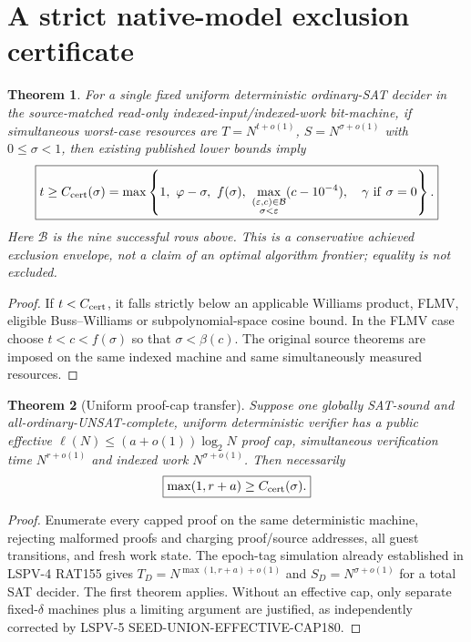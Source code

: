 \documentclass[11pt]{article}
\newtheorem{theorem}{Theorem}
\begin{document}
\section{A strict native-model exclusion certificate}
\begin{theorem}
For a \emph{single fixed uniform deterministic ordinary-SAT decider}
in the source-matched read-only indexed-input/indexed-work bit-machine,
if simultaneous worst-case resources are
$T=N^{t+o(1)}$, $S=N^{\sigma+o(1)}$ with $0\le\sigma<1$,
then existing published lower bounds imply
\[
\boxed{\displaystyle
 t\ge C_{\rm cert}(\sigma)=
\max\left\{1,\ \varphi-\sigma,\ f(\sigma),\
\max_{\substack{(\varepsilon,c)\in\mathcal B\\\sigma<\varepsilon}}
(c-10^{-4}),\quad\gamma\ {\rm if}\ \sigma=0\right\}.
}
\]
Here $\mathcal B$ is the nine successful rows above.
This is a conservative achieved exclusion envelope,
not a claim of an optimal algorithm frontier;
equality is not excluded.
\end{theorem}
\begin{proof}
If $t<C_{\rm cert}$, it falls strictly below an applicable
Williams product, FLMV, eligible Buss--Williams or
subpolynomial-space cosine bound. In the FLMV case choose
$t<c<f(\sigma)$ so that $\sigma<\beta(c)$.
The original source theorems are imposed on the same
indexed machine and same simultaneously measured resources.
\end{proof}
\begin{theorem}[Uniform proof-cap transfer]
Suppose one globally SAT-sound and all-ordinary-UNSAT-complete,
uniform deterministic verifier has a public effective
$\ell(N)\le(a+o(1))\log_2N$ proof cap,
simultaneous verification time $N^{r+o(1)}$ and indexed work
$N^{\sigma+o(1)}$. Then necessarily
\[
\boxed{\max(1,r+a)\ge C_{\rm cert}(\sigma).}
\]
\end{theorem}
\begin{proof}
Enumerate every capped proof on the same deterministic machine,
rejecting malformed proofs and charging proof/source addresses,
all guest transitions, and fresh work state. The epoch-tag
simulation already established in LSPV-4 RAT155 gives
$T_D=N^{\max(1,r+a)+o(1)}$ and
$S_D=N^{\sigma+o(1)}$ for a total SAT decider.
The first theorem applies. Without an effective cap,
only separate fixed-$\delta$ machines plus a limiting argument
are justified, as independently corrected by LSPV-5
SEED-UNION-EFFECTIVE-CAP180.
\end{proof}
\end{document}
